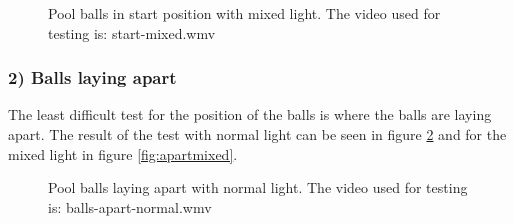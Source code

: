 \begin{figure}[H]
  \centering
\quad
\quad
   \caption{Pool balls in start position with mixed light. The video used for testing is: start-mixed.wmv}
  \label{fig:poolposstart2}
\end{figure}


\subsubsection{ 2) Balls laying apart}
The least difficult test for the position of the balls is where the balls are laying apart. The result of the test with normal light can be seen in figure \ref{fig:apartnormal} and for the mixed light in figure \ref{fig:apartmixed}.

\begin{figure}[H]
  \centering
   \caption{Pool balls laying apart with normal light. The video used for testing is: balls-apart-normal.wmv}
  \label{fig:apartnormal}
\end{figure}

